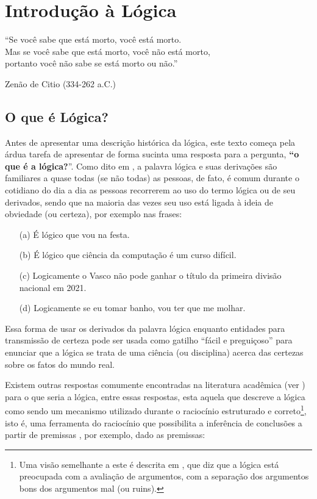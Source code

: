 \chapter{Introdução à Lógica}\label{cap:IntroLogic}

\epigraph{``Se você sabe que está morto, você está morto.\\ Mas se você sabe que está morto, você não está morto,\\ portanto você não sabe se está morto ou não.''}{Zenão de Citio (334-262 a.C.)}

\section{O que é Lógica?}\label{sec:WhatIsLogic}

Antes de apresentar uma descrição histórica da lógica, este texto começa pela árdua tarefa de apresentar de forma sucinta uma resposta para a pergunta, \textbf{``o que é a lógica?}''. Como dito em \cite{benja-Logica, copi1981}, a palavra lógica e suas derivações são familiares a quase todas (se não todas) as pessoas, de fato, é comum durante o cotidiano do dia a dia as pessoas recorrerem ao uso do termo lógica ou de seu derivados, sendo que na maioria das vezes seu uso está ligada à ideia de obviedade (ou certeza), por exemplo nas frases:

\begin{itemize}
  \item[(a)] É lógico que vou na festa.
  \item[(b)] É lógico que ciência da computação é um curso difícil.
  \item[(c)] Logicamente o Vasco não pode ganhar o título da primeira divisão nacional em 2021.
  \item[(d)] Logicamente se eu tomar banho, vou ter que me molhar.
\end{itemize}

Essa forma de usar os derivados da palavra lógica enquanto entidades para transmissão de certeza pode ser usada como gatilho ``fácil e preguiçoso'' para enunciar que a lógica se trata de uma ciência (ou disciplina) acerca das certezas sobre os fatos do mundo real.

Existem outras respostas comumente encontradas na literatura acadêmica (ver \cite{abe2002-logica, benja-Logica, joaoPavao2014}) para o que seria a lógica, entre essas respostas, esta aquela que descreve a lógica como sendo um mecanismo utilizado durante o raciocínio estruturado e correto\footnote{Uma visão semelhante a este é descrita em \cite{magnus2020}, que diz que a lógica está preocupada com a avaliação de argumentos, com a separação dos argumentos bons dos argumentos mal (ou ruins).}, isto é, uma ferramenta do raciocínio que possibilita a inferência de conclusões a partir de premissas \cite{abe2002-logica, copi1981, hodges1997}, por exemplo, dado as premissas:


